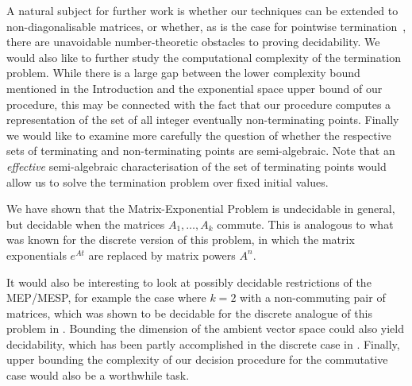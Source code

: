 A natural subject for further work is whether our techniques can be
extended to non-diagonalisable matrices, or whether, as is the case
for pointwise termination~\cite{OW14:SODA}, there are unavoidable
number-theoretic obstacles to proving decidability.  We would also like
to further study the computational complexity of the termination
problem.  While there is a large gap between the \coNP lower
complexity bound mentioned in the Introduction and the exponential
space upper bound of our procedure, this may be connected with the
fact that our procedure computes a representation of the set of all
integer eventually non-terminating points. Finally we would like to
examine more carefully the question of whether the respective sets of
terminating and non-terminating points are semi-algebraic.  Note that
an \emph{effective} semi-algebraic characterisation of the set of
terminating points would allow us to solve the termination problem
over fixed initial values.





We have shown that the Matrix-Exponential Problem is undecidable in
general, but decidable when the matrices $A_{1}, \ldots, A_{k}$ commute.
This is analogous to what was known for the discrete version
of this problem, in which the matrix exponentials $e^{At}$ are
replaced by matrix powers $A^n$.

It would also be interesting to look at possibly decidable
restrictions of the MEP/MESP, for example the case where $k=2$ with a
non-commuting pair of matrices, which was shown to be decidable for
the discrete analogue of this problem in \cite{MEHTP}. Bounding the dimension of the ambient vector space could also yield decidability, which has been partly accomplished in the discrete case in \cite{CK05}. Finally, upper bounding the complexity of our decision procedure for the commutative case would also be a worthwhile task.

